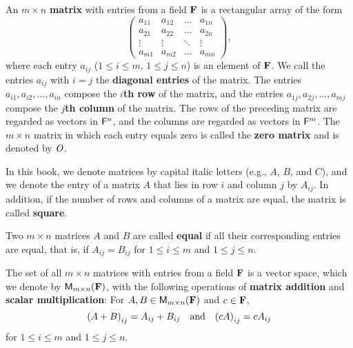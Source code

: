 \begin{defn}\label{1.2.6}
  An \(m \times n\) \textbf{matrix} with entries from a field \(\mathbf{F}\) is a rectangular array of the form
  \[
    \begin{pmatrix}
      a_{1 1} & a_{1 2} & \dots  & a_{1 n} \\
      a_{2 1} & a_{2 2} & \dots  & a_{2 n} \\
      \vdots  & \vdots  & \ddots & \vdots  \\
      a_{m 1} & a_{m 2} & \dots  & a_{m n}
    \end{pmatrix},
  \]
  where each entry \(a_{i j}\) (\(1 \leq i \leq m\), \(1 \leq j \leq n\)) is an element of \(\mathbf{F}\).
  We call the entries \(a_{i j}\) with \(i = j\) the \textbf{diagonal entries} of the matrix.
  The entries \(a_{i 1} ,a_{i 2} , \dots, a_{i n}\) compose the \textbf{\(i\)th row} of the matrix, and the entries \(a_{1 j}, a_{2 j}, \dots, a_{m j}\) compose the \textbf{\(j\)th column} of the matrix.
  The rows of the preceding matrix are regarded as vectors in \(\mathsf{F}^{n}\), and the columns are regarded as vectors in \(\mathsf{F}^{m}\).
  The \(m \times n\) matrix in which each entry equals zero is called the \textbf{zero matrix} and is denoted by \(\mathit{O}\).
\end{defn}

\begin{defn}\label{1.2.7}
  In this book, we denote matrices by capital italic letters (e.g., \(A\), \(B\), and \(C\)), and we denote the entry of a matrix \(A\) that lies in row \(i\) and column \(j\) by \(A_{i j}\).
  In addition, if the number of rows and columns of a matrix are equal, the matrix is called \textbf{square}.
\end{defn}

\begin{defn}\label{1.2.8}
  Two \(m \times n\) matrices \(A\) and \(B\) are called \textbf{equal} if all their corresponding entries are equal, that is, if \(A_{i j} = B_{i j}\) for \(1 \leq i \leq m\) and \(1 \leq j \leq n\).
\end{defn}

\begin{eg}\label{1.2.9}
  The set of all \(m \times n\) matrices with entries from a field \(\mathbf{F}\) is a vector space, which we denote by \({{\mathsf{M}_{{m} \times n}({\mathbf{F}})}}\), with the following operations of \textbf{matrix addition} and \textbf{scalar multiplication}:
  For \(A, B \in {{\mathsf{M}_{{m} \times n}({\mathbf{F}})}}\) and \(c \in \mathbf{F}\),
  \[
    \p{A + B}_{i j} = A_{i j} + B_{i j} \quad \text{and} \quad \p{c A}_{i j} = c A_{i j}
  \]
  for \(1 \leq i \leq m\) and \(1 \leq j \leq n\).
\end{eg}

